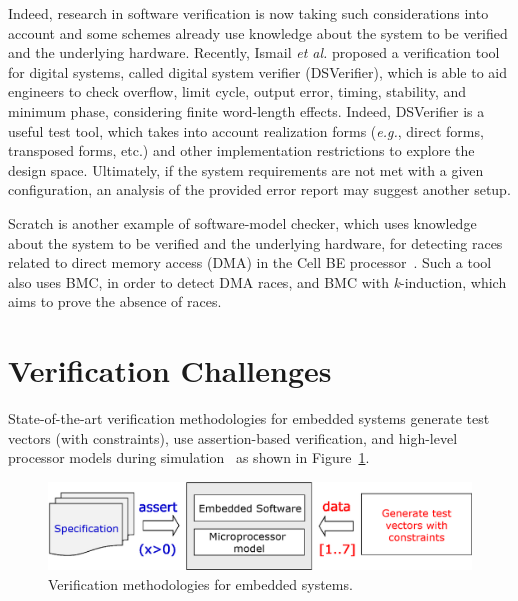 \documentclass{acm_sen_article}
\begin{document}
Indeed, research in software verification is now taking such considerations into account and some schemes already use knowledge about the system to be verified and the underlying hardware. Recently, Ismail {\it et al.} \cite{dsv_spin2015}  proposed a verification tool for digital systems, called digital system verifier (DSVerifier), which is able to aid engineers to check overflow, limit cycle, output error, timing, stability, and minimum phase, considering finite word-length effects. Indeed, DSVerifier is a useful test tool, which takes into account realization forms ({\it e.g.}, direct forms, transposed forms, etc.) and other implementation restrictions to explore the design space. Ultimately, if the system requirements are not met with a given configuration, an analysis of the provided error report may suggest another setup. 

Scratch is another example of software-model checker, which uses knowledge about the system to be verified and the underlying hardware, for detecting races related to direct memory access (DMA) in the Cell BE processor~\cite{Donaldson10}. Such a tool also uses BMC, in order to detect DMA races, and BMC with \textit{k}-induction, which aims to prove the absence of races.

\section{Verification Challenges}

State-of-the-art verification methodologies for embedded systems generate test vectors (with constraints), use assertion-based verification, and high-level processor models during simulation~\cite{Behrend15,Lettnin09} as shown in Figure~\ref{verification-methodologies}. 
%
\begin{figure}[h]
	\centering
	\includegraphics[scale=0.35]{figure2.eps}
	\caption{Verification methodologies for embedded systems.}
	\label{verification-methodologies}
\end{figure}
\end{document}
